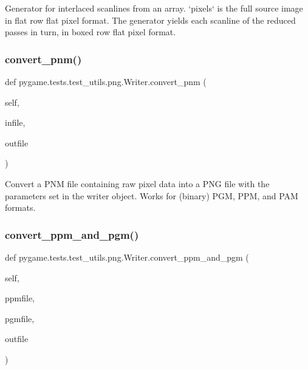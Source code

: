 \begin{DoxyVerb}Generator for interlaced scanlines from an array.  `pixels` is
the full source image in flat row flat pixel format.  The
generator yields each scanline of the reduced passes in turn, in
boxed row flat pixel format.
\end{DoxyVerb}
 \mbox{\label{classpygame_1_1tests_1_1test__utils_1_1png_1_1_writer_a14ce6ad7dc03b7f740da76c9e6eaa172}} 
\subsubsection{\texorpdfstring{convert\+\_\+pnm()}{convert\_pnm()}}
{\footnotesize\ttfamily def pygame.\+tests.\+test\+\_\+utils.\+png.\+Writer.\+convert\+\_\+pnm (\begin{DoxyParamCaption}\item[{}]{self,  }\item[{}]{infile,  }\item[{}]{outfile }\end{DoxyParamCaption})}

\begin{DoxyVerb}Convert a PNM file containing raw pixel data into a PNG file
with the parameters set in the writer object.  Works for
(binary) PGM, PPM, and PAM formats.
\end{DoxyVerb}
 \mbox{\label{classpygame_1_1tests_1_1test__utils_1_1png_1_1_writer_a6fb7cb85c741d8555c41e60357f2d6de}} 
\subsubsection{\texorpdfstring{convert\+\_\+ppm\+\_\+and\+\_\+pgm()}{convert\_ppm\_and\_pgm()}}
{\footnotesize\ttfamily def pygame.\+tests.\+test\+\_\+utils.\+png.\+Writer.\+convert\+\_\+ppm\+\_\+and\+\_\+pgm (\begin{DoxyParamCaption}\item[{}]{self,  }\item[{}]{ppmfile,  }\item[{}]{pgmfile,  }\item[{}]{outfile }\end{DoxyParamCaption})}

